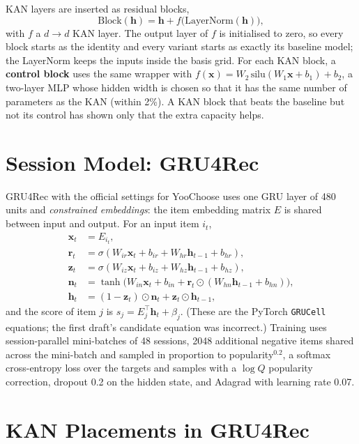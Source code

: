 \documentclass[12pt,a4paper]{report}
\begin{document}
KAN layers are inserted as residual blocks,
\begin{equation}
\mathrm{Block}(\mathbf{h}) = \mathbf{h} + f\big(\mathrm{LayerNorm}(\mathbf{h})\big),
\label{eq:block}
\end{equation}
with $f$ a $d \to d$ KAN layer. The output layer of $f$ is initialised to zero,
so every block starts as the identity and every variant starts as exactly its
baseline model; the LayerNorm keeps the inputs inside the basis grid. For each KAN block, a \textbf{control block} uses the same
wrapper with $f(\mathbf{x}) = W_2\, \mathrm{silu}(W_1 \mathbf{x} + b_1) + b_2$, a
two-layer MLP whose hidden width is chosen so that it has the same number of
parameters as the KAN (within 2\%). A KAN block that beats the baseline but not
its control has shown only that the extra capacity helps.

\section{Session Model: GRU4Rec}

GRU4Rec \cite{hidasi2016,hidasi2018} with the official settings for YooChoose
uses one GRU layer of 480 units and \emph{constrained embeddings}: the item
embedding matrix $E$ is shared between input and output. For an input item $i_t$,
\begin{align}
\mathbf{x}_t &= E_{i_t}, \\
\mathbf{r}_t &= \sigma(W_{ir}\mathbf{x}_t + b_{ir} + W_{hr}\mathbf{h}_{t-1} + b_{hr}), \\
\mathbf{z}_t &= \sigma(W_{iz}\mathbf{x}_t + b_{iz} + W_{hz}\mathbf{h}_{t-1} + b_{hz}), \\
\mathbf{n}_t &= \tanh\big(W_{in}\mathbf{x}_t + b_{in} + \mathbf{r}_t \odot (W_{hn}\mathbf{h}_{t-1} + b_{hn})\big), \\
\mathbf{h}_t &= (1 - \mathbf{z}_t) \odot \mathbf{n}_t + \mathbf{z}_t \odot \mathbf{h}_{t-1},
\end{align}
and the score of item $j$ is $s_j = E_j^\top \mathbf{h}_t + \beta_j$.
(These are the PyTorch \texttt{GRUCell} equations; the first draft's candidate
equation was incorrect.) Training uses session-parallel mini-batches of 48
sessions, 2048 additional negative items shared across the mini-batch and
sampled in proportion to popularity$^{0.2}$, a softmax cross-entropy loss over
the targets and samples with a $\log Q$ popularity correction, dropout 0.2 on the
hidden state, and Adagrad with learning rate 0.07.

\section{KAN Placements in GRU4Rec}
\end{document}
